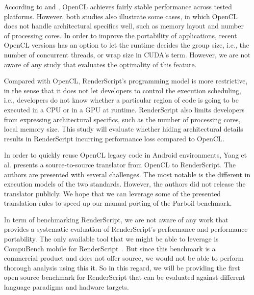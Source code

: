 According to \cite{komatsu2010evaluating} and \cite{dolbeau2013one}, OpenCL
achieves fairly stable performance across tested platforms. However, both
studies also illustrate some cases, in which OpenCL does not handle
architectural specifics well, such as memory layout and number of processing
cores. In order to improve the portability of applications, recent OpenCL
versions has an option to let the runtime decides the group size, i.e., the
number of concurrent threads, or wrap size in CUDA's term. However, we are not
aware of any study that evaluates the optimality of this feature.

Compared with OpenCL, RenderScript's programming model is more restrictive, in
the sense that it does not let developers to control the execution scheduling,
i.e., developers do not know whether a particular region of code is going to be
executed in a CPU or in a GPU at runtime. RenderScript also limits developers
from expressing architectural specifics, such as the number of processing cores,
local memory size. This study will evaluate whether hiding architectural details
results in RenderScript incurring performance loss compared to OpenCL.

In order to quickly reuse OpenCL legacy code in Android environments, Yang et
al.  \cite{yang2012o2render} presents a source-to-source translator from OpenCL
to RenderScript. The authors are presented with several challenges.  The most
notable is the different in execution models of the two standards.  However, the
authors did not release the translator publicly.  We hope that we can leverage
some of the presented translation rules to speed up our manual porting of the
Parboil benchmark.

In term of benchmarking RenderScript, we are not aware of any work that provides
a systematic evaluation of RenderScript's performance and performance
portability. The only available tool that we might be able to leverage is
CompuBench mobile for RenderScript~\cite{compuBenchMobile}.  But since this
benchmark is a commercial product and does not offer source, we would not be
able to perform thorough analysis using this it.  So in this regard, we will be
providing the first open source benchmark for RenderScript that can be evaluated
against different language paradigms and hadware targets.
